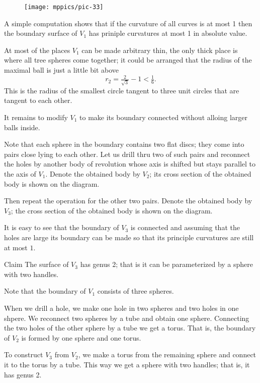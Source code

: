 \begin{figure}[h!]%
\centering
\texttt{[image: mppics/pic-33]}
\vskip0mm
\end{figure}

A simple computation shows that if the curvature of all curves is at most 1 then the boundary surface of $V_1$ has priniple curvatures at most 1 in absolute value.

At most of the places $V_1$ can be made arbitrary thin,
the only thick place is where all tree spheres come together;
it could be arranged that the radius of the maximal ball is  just a little bit above 
\[r_2=\tfrac2{\sqrt{3}}-1< \tfrac16.\]
This is the radius of the smallest circle tangent to three unit circles that are tangent to each other.


It remains to modify $V_1$ to make its boundary connected without  alloing larger balls inside.

Note that each sphere in the boundary contains two flat discs;
they come into pairs close lying to each other. 
Let us drill thru two of such pairs and reconnect the holes by another body of revolution whose 
axis is shifted but stays parallel to the axis of $V_1$.
Denote the obtained body by $V_2$; its cross section of the obtained body is shown on the diagram. 

Then repeat the operation for the other two pairs.
Denote the obtained body by $V_3$; the cross section of the obtained body is shown on the diagram.

It is easy to see that the boundary of $V_3$ is connected
and assuming that the holes are large its boundary can be made so that its principle curvatures are still at most $1$.
\qeds

\begin{thm}{Claim}
The surface of $V_3$ has genus 2; that is it can be parameterized by a sphere with two handles.
\end{thm}


Note that the boundary of $V_1$ consists of three spheres.

When we drill a hole, we make one hole in two spheres and two holes in one shpere.
We reconnect two spheres by a tube and obtain one sphere.
Connecting the two holes of the other sphere by a tube we get a torus.
That is, the boundary of $V_2$ is formed by one sphere and one torus.

To construct $V_3$ from $V_2$, we make a torus from the remaining sphere and connect it to the torus by a tube.
This way we get a sphere with two handles; that is, it has genus 2.
\qeds

